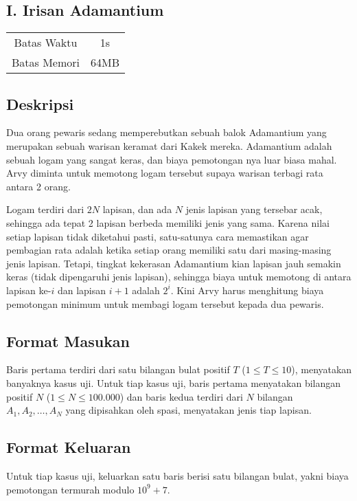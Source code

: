 \documentclass{article}
\begin{document}
\begin{center}
    \section*{I. Irisan Adamantium} %

    \begin{tabular}{ | c c | }
        \hline
        Batas Waktu  & 1s \\    %
        Batas Memori & 64MB \\  %
        \hline
    \end{tabular}
\end{center}

\subsection*{Deskripsi}
Dua orang pewaris sedang memperebutkan sebuah balok Adamantium yang merupakan sebuah warisan keramat dari Kakek mereka.
Adamantium adalah sebuah logam yang sangat keras, dan biaya pemotongan nya luar biasa mahal.
Arvy diminta untuk memotong logam tersebut supaya warisan terbagi rata antara 2 orang.

Logam terdiri dari $2N$ lapisan, dan ada $N$ jenis lapisan yang tersebar acak, sehingga ada tepat 2 lapisan berbeda memiliki jenis yang sama.
Karena nilai setiap lapisan tidak diketahui pasti, satu-satunya cara memastikan agar pembagian rata adalah ketika setiap orang memiliki satu dari masing-masing jenis lapisan.
Tetapi, tingkat kekerasan Adamantium kian lapisan jauh semakin keras (tidak dipengaruhi jenis lapisan), sehingga biaya untuk memotong di antara lapisan ke-$i$ dan lapisan $i+1$ adalah $2^i$.
Kini Arvy harus menghitung biaya pemotongan minimum untuk membagi logam tersebut kepada dua pewaris.

\subsection*{Format Masukan}
Baris pertama terdiri dari satu bilangan bulat positif $T$ ($1 \leq T \leq 10$), menyatakan banyaknya kasus uji.
Untuk tiap kasus uji, baris pertama menyatakan bilangan positif $N$ ($1 \leq N \leq 100.000$) dan baris kedua terdiri dari $N$ bilangan $A_1, A_2, \dots, A_N$ yang dipisahkan oleh spasi, menyatakan jenis tiap lapisan.

\subsection*{Format Keluaran}
Untuk tiap kasus uji, keluarkan satu baris berisi satu bilangan bulat, yakni biaya pemotongan termurah modulo ${10}^9+7$.
\\
\end{document}
